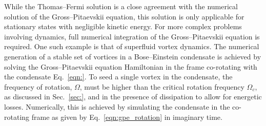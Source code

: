 While the Thomas--Fermi solution is a close agreement with the numerical solution of the Gross--Pitaevskii equation, this solution is only applicable for stationary states with negligible kinetic energy. For more complex problems involving dynamics, full numerical integration of the Gross--Pitaevskii equation is required. One such example is that of superfluid vortex dynamics. The numerical generation of a stable set of vortices in a Bose--Einstein condensate is achieved by solving the Gross--Pitaevskii equation Hamiltonian in the frame co-rotating with the condensate Eq.~\ref{eqn:}. To seed a single vortex in the condensate, the frequency of rotation, $\Omega$, must be higher than the critical rotation frequency $\Omega_c$, as discussed in Sec.~\ref{sec:}, and in the presence of dissipation to allow for energetic losses. Numerically, this is achieved by simulating the condensate in the co-rotating frame as given by Eq.~\ref{eqn:gpe_rotation} in imaginary time.

